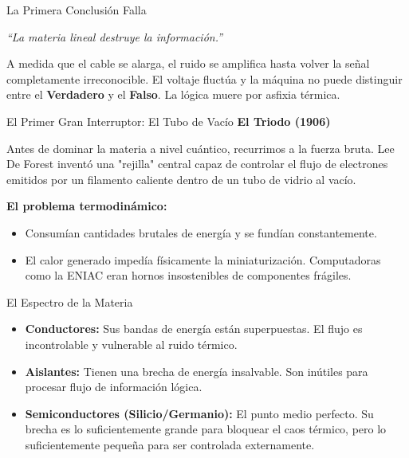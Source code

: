 \documentclass[10pt, aspectratio=169]{beamer}
\begin{document}
\begin{frame}{La Primera Conclusión Falla}
    \vspace{0.8cm}
    \begin{center}
        \huge \textit{``La materia lineal destruye la información.''}
    \end{center}
    
    \vspace{0.8cm}
    \normalsize
    A medida que el cable se alarga, el ruido se amplifica hasta volver la señal completamente irreconocible. El voltaje fluctúa y la máquina no puede distinguir entre el \textbf{Verdadero} y el \textbf{Falso}. La lógica muere por asfixia térmica.
\end{frame}


\begin{frame}{El Primer Gran Interruptor: El Tubo de Vacío}
    \vspace{0.4cm}
    \Large \textbf{El Triodo (1906)}
    
    \vspace{0.4cm}
    \normalsize
    Antes de dominar la materia a nivel cuántico, recurrimos a la fuerza bruta. Lee De Forest inventó una "rejilla" central capaz de controlar el flujo de electrones emitidos por un filamento caliente dentro de un tubo de vidrio al vacío.
    
    \vspace{0.4cm}
    \textbf{El problema termodinámico:}
    \begin{itemize}
        \item Consumían cantidades brutales de energía y se fundían constantemente.
        \item El calor generado impedía físicamente la miniaturización. Computadoras como la ENIAC eran hornos insostenibles de componentes frágiles.
    \end{itemize}
\end{frame}


\begin{frame}{El Espectro de la Materia}
    \vspace{0.6cm}
    \begin{itemize}
        \setlength\itemsep{0.3cm}
        \item \textbf{Conductores:} Sus bandas de energía están superpuestas. El flujo es incontrolable y vulnerable al ruido térmico.
        \item \textbf{Aislantes:} Tienen una brecha de energía insalvable. Son inútiles para procesar flujo de información lógica.
        \item \textbf{Semiconductores (Silicio/Germanio):} El punto medio perfecto. Su brecha es lo suficientemente grande para bloquear el caos térmico, pero lo suficientemente pequeña para ser controlada externamente.
    \end{itemize}
\end{frame}
\end{document}
